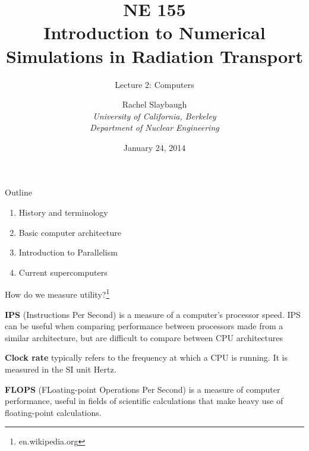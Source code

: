 \documentclass[xcolor=x11names,compress]{beamer}
\renewcommand{\(}{\begin{columns}}
\renewcommand{\)}{\end{columns}}
\newcommand{\<}[1]{\begin{column}{#1}}
\renewcommand{\>}{\end{column}}
\begin{document}
\begin{frame}
\title{NE 155\\Introduction to Numerical Simulations in Radiation Transport}
\subtitle{Lecture 2: Computers}
\author{
        Rachel Slaybaugh\\
        \vspace*{1em}
        {\it University of California, Berkeley\\
         Department of Nuclear Engineering}\\
}
\date{January 24, 2014}
\titlepage
\end{frame}


\begin{frame}{Outline}
\begin{enumerate}
\item History and terminology
\item Basic computer architecture
\item Introduction to Parallelism
\item Current supercomputers
\end{enumerate}
\end{frame}

\begin{frame}{How do we measure utility?\footnote{en.wikipedia.org}}

\textbf{IPS} (Instructions Per Second) is a measure of a computer's processor speed. IPS can be useful when comparing performance between processors made from a similar architecture, but are difficult to compare between CPU architectures

\vspace*{1 em}
\textbf{Clock rate} typically refers to the frequency at which a CPU is running. It is measured in the SI unit Hertz.

\vspace*{1 em}
\textbf{FLOPS} (FLoating-point Operations Per Second) is a measure of computer performance, useful in fields of scientific calculations that make heavy use of floating-point calculations. 
\end{frame}
\end{document}
